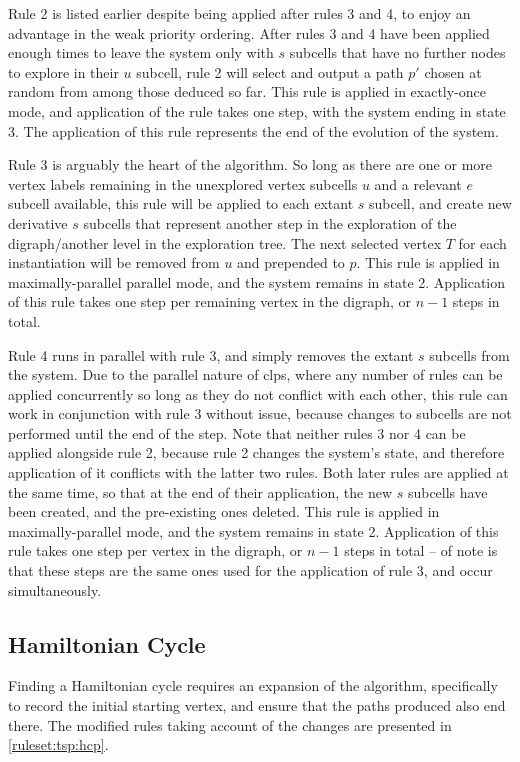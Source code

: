 Rule 2 is listed earlier despite being applied after rules 3 and 4, to enjoy an advantage in the weak priority ordering.  After rules 3 and 4 have been applied enough times to leave the system only with \(s\) subcells that have no further nodes to explore in their \(u\) subcell, rule 2 will select and output a path \(p'\) chosen at random from among those deduced so far.  This rule is applied in exactly-once mode, and application of the rule takes one step, with the system ending in state 3.  The application of this rule represents the end of the evolution of the system.

Rule 3 is arguably the heart of the algorithm.  So long as there are one or more vertex labels remaining in the unexplored vertex subcells \(u\) and a relevant \(e\) subcell available, this rule will be applied to each extant \(s\) subcell, and create new derivative \(s\) subcells that represent another step in the exploration of the digraph/another level in the exploration tree.  The next selected vertex \(T\) for each instantiation will be removed from \(u\) and prepended to \(p\).  This rule is applied in maximally-parallel parallel mode, and the system remains in state 2.  Application of this rule takes one step per remaining vertex in the digraph, or \(n - 1\) steps in total.

Rule 4 runs in parallel with rule 3, and simply removes the extant \(s\) subcells from the system.  Due to the parallel nature of \gls{clps}, where any number of rules can be applied concurrently so long as they do not conflict with each other, this rule can work in conjunction with rule 3 without issue, because changes to subcells are not performed until the end of the step.  Note that neither rules 3 nor 4 can be applied alongside rule 2, because rule 2 changes the system's state, and therefore application of it conflicts with the latter two rules.  Both later rules are applied at the same time, so that at the end of their application, the new \(s\) subcells have been created, and the pre-existing ones deleted.  This rule is applied in maximally-parallel mode, and the system remains in state 2.  Application of this rule takes one step per vertex in the digraph, or \(n - 1\) steps in total -- of note is that these steps are the same ones used for the application of rule 3, and occur simultaneously.

\subsection{Hamiltonian Cycle}
Finding a Hamiltonian cycle requires an expansion of the algorithm, specifically to record the initial starting vertex, and ensure that the paths produced also end there.  The modified rules taking account of the changes are presented in \autoref{ruleset:tsp:hcp}.

